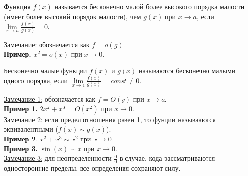 \documentclass{article}
\begin{document}
\begin{definition}
    Функция \(f(x)\) называется бесконечно малой более высокого порядка малости (имеет более высокий порядок малости), чем \(g(x)\) при \(x \to a\), если \(\displaystyle \lim\limits_{x \to a}\frac{f(x)}{g(x)} = 0\).   
\end{definition}
\noindent
\underline{Замечание:} обозначается как \(f = o(g)\).\\[0.1cm]
\textbf{Пример.} \(x^2 = o(x)\) при \(x \to 0\).

\begin{definition}
    Бесконечно малые функции \(f(x)\) и \(g(x)\) называются бесконечно малыми одного порядка, если \(\displaystyle \lim\limits_{x \to a}\frac{f(x)}{g(x)} = const \neq 0\).   
\end{definition}
\noindent
\underline{Замечание 1:} обозначается как \(f = O(g)\) при \(x \to a\).\\[0.1cm]
\textbf{Пример 1.} \(2x^2 + x^3 = O(x^2)\) при \(x \to 0\).\\
\underline{Замечание 2:} если предел отношения равен 1, то фунции называаются эквивалентными (\(f(x) \sim g(x)\)).\\[0.1cm]
\textbf{Пример 2.} \(x^2 + x^3 \sim x^2\) при \(x \to 0\).\\
\textbf{Пример 3.} \(\sin(x) \sim x\) при \(x \to 0\).\\
\underline{Замечание 3:} для неопределенности \(\displaystyle \frac{0}{0}\) в случае, кода рассматриваются односторонние пределы, все определения сохраняют силу.

\end{document}
